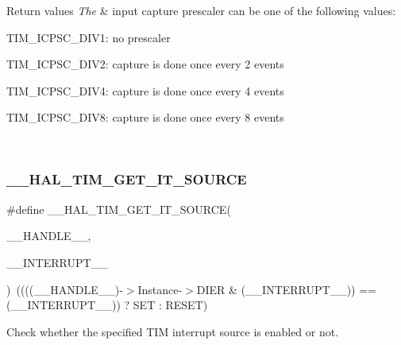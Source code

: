 \begin{DoxyRetVals}{Return values}
{\em The} & input capture prescaler can be one of the following values\+: \begin{DoxyItemize}
\item T\+I\+M\+\_\+\+I\+C\+P\+S\+C\+\_\+\+D\+I\+V1\+: no prescaler \item T\+I\+M\+\_\+\+I\+C\+P\+S\+C\+\_\+\+D\+I\+V2\+: capture is done once every 2 events \item T\+I\+M\+\_\+\+I\+C\+P\+S\+C\+\_\+\+D\+I\+V4\+: capture is done once every 4 events \item T\+I\+M\+\_\+\+I\+C\+P\+S\+C\+\_\+\+D\+I\+V8\+: capture is done once every 8 events \end{DoxyItemize}
\\
\hline
\end{DoxyRetVals}
\mbox{\label{group___t_i_m___exported___macros_ga644babf93470a6eee6bce8906c4da5c5}} 
\subsubsection{\texorpdfstring{\+\_\+\+\_\+\+H\+A\+L\+\_\+\+T\+I\+M\+\_\+\+G\+E\+T\+\_\+\+I\+T\+\_\+\+S\+O\+U\+R\+CE}{\_\_HAL\_TIM\_GET\_IT\_SOURCE}}
{\footnotesize\ttfamily \#define \+\_\+\+\_\+\+H\+A\+L\+\_\+\+T\+I\+M\+\_\+\+G\+E\+T\+\_\+\+I\+T\+\_\+\+S\+O\+U\+R\+CE(\begin{DoxyParamCaption}\item[{}]{\+\_\+\+\_\+\+H\+A\+N\+D\+L\+E\+\_\+\+\_\+,  }\item[{}]{\+\_\+\+\_\+\+I\+N\+T\+E\+R\+R\+U\+P\+T\+\_\+\+\_\+ }\end{DoxyParamCaption})~((((\+\_\+\+\_\+\+H\+A\+N\+D\+L\+E\+\_\+\+\_\+)-\/$>$Instance-\/$>$D\+I\+ER \& (\+\_\+\+\_\+\+I\+N\+T\+E\+R\+R\+U\+P\+T\+\_\+\+\_\+)) == (\+\_\+\+\_\+\+I\+N\+T\+E\+R\+R\+U\+P\+T\+\_\+\+\_\+)) ? S\+ET \+: R\+E\+S\+ET)}



Check whether the specified T\+IM interrupt source is enabled or not. 


